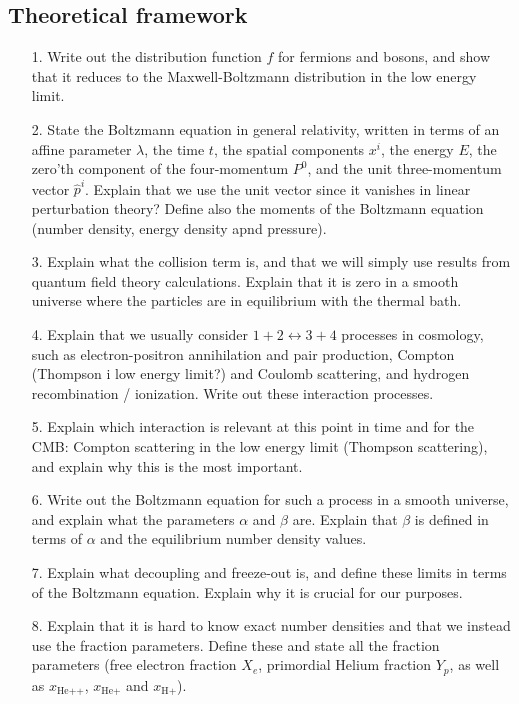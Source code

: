 \documentclass{aa}
\begin{document}
\subsection{Theoretical framework}\label{subsec: II theory}
\begin{enumerate}
  \item [1.] Write out the distribution function $f$ for fermions and bosons, and show that it reduces to the Maxwell-Boltzmann distribution in the low energy limit.
  \item [2.] State the Boltzmann equation in general relativity, written in terms of an affine parameter $\lambda$, the time $t$, the spatial components $x^i$, the energy $E$, the zero'th component of the four-momentum $P^0$, and the unit three-momentum vector $\hat{p}^i$. Explain that we use the unit vector since it vanishes in linear perturbation theory? Define also the moments of the Boltzmann equation (number density, energy density apnd pressure).
  \item [3.] Explain what the collision term is, and that we will simply use results from quantum field theory calculations. Explain that it is zero in a smooth universe where the particles are in equilibrium with the thermal bath.
  \item [4.] Explain that we usually consider $1+2\leftrightarrow3+4$ processes in cosmology, such as electron-positron annihilation and pair production, Compton (Thompson i low energy limit?) and Coulomb scattering, and hydrogen recombination / ionization. Write out these interaction processes. 
  \item [5.] Explain which interaction is relevant at this point in time and for the CMB: Compton scattering in the low energy limit (Thompson scattering), and explain why this is the most important.
  \item [6.] Write out the Boltzmann equation for such a process in a smooth universe, and explain what the parameters $\alpha$ and $\beta$ are. Explain that $\beta$ is defined in terms of $\alpha$ and the equilibrium number density values.
  \item [7.] Explain what decoupling and freeze-out is, and define these limits in terms of the Boltzmann equation. Explain why it is crucial for our purposes.
  \item [8.] Explain that it is hard to know exact number densities and that we instead use the fraction parameters. Define these and state all the fraction parameters (free electron fraction $X_e$, primordial Helium fraction $Y_p$, as well as $x_\text{He++}$, $x_\text{He+}$ and $x_\text{H+}$).

\end{enumerate}
\end{document}
